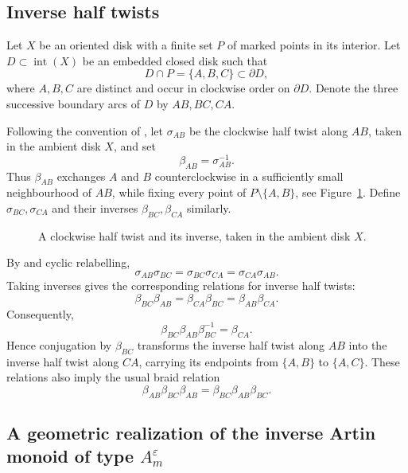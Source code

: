 \documentclass[a4paper, 12pt, reqno]{amsart}
\theoremstyle{definition}
\newcommand{\TwistRow}[4]{%
  \begin{scope}[yshift=#1]
    \node at (0,1.12) {#4};
    \draw[edge] (-1,0)--(1,0)--(0,-1.6)--cycle;
    \draw[neighbourhood] (0,0) ellipse[x radius=1.48,y radius=.72];
    \node[font=\small] at (-1.15,.64) {};
    \ifnum#2=1
      \draw[a-motion] (-1,0)
        arc[start angle=180,end angle=0,x radius=1,y radius=.46];
      \draw[b-motion] (1,0)
        arc[start angle=0,end angle=-180,x radius=1,y radius=.46];
    \else
      \draw[a-motion] (-1,0)
        arc[start angle=180,end angle=360,x radius=1,y radius=.46];
      \draw[b-motion] (1,0)
        arc[start angle=0,end angle=180,x radius=1,y radius=.46];
    \fi
    \node[a-dot,label=left:$A$] at (-1,0) {};
    \node[b-dot,label=right:$B$] at (1,0) {};
    \node[c-dot,label=below:$C$] at (0,-1.6) {};
    \node[anchor=west,font=\small] at (.17,-1.6) {fixed};
    \draw[-{Latex[length=2.7mm]},semithick]
      (1.9,-.18)--node[above=3pt] {$#3$} (3.25,-.18);
    \begin{scope}[xshift=5.2cm]
      \node at (0,1.12) {After the half twist};
      \draw[edge] (-1,0)--(1,0);
      \draw[neighbourhood] (0,0)
        ellipse[x radius=1.48,y radius=.72];
      \node[b-dot,label=left:$B$] at (-1,0) {};
      \node[a-dot,label=right:$A$] at (1,0) {};
      \node[c-dot,label=below:$C$] at (0,-1.6) {};
      \node[anchor=west,font=\small] at (.17,-1.6) {fixed};
    \end{scope}
  \end{scope}%
}
\begin{document}
\subsection{Inverse half twists}\label{sec:inverse half twists}

Let $X$ be an oriented disk with a finite set $P$ of marked points in its interior. Let $D\subset\operatorname{int}(X)$ be an embedded closed disk such that
\[
D\cap P=\{A,B,C\}\subset\partial D,
\]
where $A,B,C$ are distinct and occur in clockwise order on $\partial D$. Denote the three successive boundary arcs of $D$ by $AB,BC,CA$.

Following the convention of \cite[Definition 3.3]{GM2017}, let $\sigma_{AB}$ be the clockwise half twist along $AB$, taken in the ambient disk $X$, and set
\[
\beta_{AB}=\sigma_{AB}^{-1}.
\]
Thus $\beta_{AB}$ exchanges $A$ and $B$ counterclockwise in a sufficiently small neighbourhood of $AB$, while fixing every point of $P\setminus\{A,B\}$, see Figure~\ref{half twist}. Define $\sigma_{BC},\sigma_{CA}$ and their inverses $\beta_{BC},\beta_{CA}$ similarly.


\begin{figure}[H]
\caption{A clockwise half twist and its inverse, taken in the ambient disk $X$.}\label{half twist}
\end{figure}


By \cite[Lemma 3.5]{GM2017} and cyclic relabelling,
\[
\sigma_{AB}\sigma_{BC}
=\sigma_{BC}\sigma_{CA}
=\sigma_{CA}\sigma_{AB}.
\]
Taking inverses gives the corresponding relations for inverse half twists:
\[
\beta_{BC}\beta_{AB}
=\beta_{CA}\beta_{BC}
=\beta_{AB}\beta_{CA}.
\]
Consequently,
\[
\beta_{BC}\beta_{AB}\beta_{BC}^{-1}=\beta_{CA}.
\]
Hence conjugation by \(\beta_{BC}\) transforms the inverse half twist along \(AB\) into the inverse half twist along \(CA\), carrying its endpoints from \(\{A,B\}\) to \(\{A,C\}\). These relations also imply the usual braid relation
\[
\beta_{AB}\beta_{BC}\beta_{AB}
=\beta_{BC}\beta_{AB}\beta_{BC}.
\]


\subsection{A geometric realization of the inverse Artin monoid of type
$A_m^\varepsilon$}\label{sec:A-geometric-preliminaries}
\end{document}
